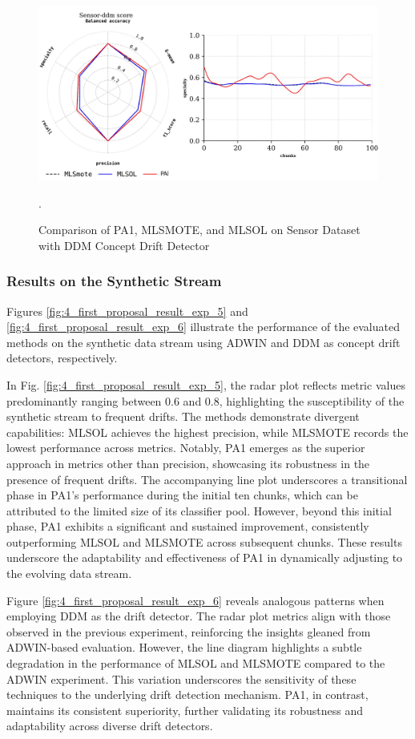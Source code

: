 \begin{figure}[!ht]
	\centering
	\includegraphics[width=1\linewidth]{4_Imbalanced/figures/exp_4.png}
  \caption{Comparison of PA1, MLSMOTE, and MLSOL on Sensor Dataset with DDM Concept Drift Detector}.
	\label{fig:4_first_proposal_result_exp_4}
\end{figure}

\subsubsection{Results on the Synthetic Stream}

Figures \ref{fig:4_first_proposal_result_exp_5} and \ref{fig:4_first_proposal_result_exp_6} illustrate the performance of the evaluated methods on the synthetic data stream using ADWIN and DDM as concept drift detectors, respectively.

In Fig. \ref{fig:4_first_proposal_result_exp_5}, the radar plot reflects metric values predominantly ranging between 0.6 and 0.8, highlighting the susceptibility of the synthetic stream to frequent drifts. The methods demonstrate divergent capabilities: MLSOL achieves the highest precision, while MLSMOTE records the lowest performance across metrics. Notably, PA1 emerges as the superior approach in metrics other than precision, showcasing its robustness in the presence of frequent drifts. The accompanying line plot underscores a transitional phase in PA1’s performance during the initial ten chunks, which can be attributed to the limited size of its classifier pool. However, beyond this initial phase, PA1 exhibits a significant and sustained improvement, consistently outperforming MLSOL and MLSMOTE across subsequent chunks. These results underscore the adaptability and effectiveness of PA1 in dynamically adjusting to the evolving data stream.

Figure \ref{fig:4_first_proposal_result_exp_6} reveals analogous patterns when employing DDM as the drift detector. The radar plot metrics align with those observed in the previous experiment, reinforcing the insights gleaned from ADWIN-based evaluation. However, the line diagram highlights a subtle degradation in the performance of MLSOL and MLSMOTE compared to the ADWIN experiment. This variation underscores the sensitivity of these techniques to the underlying drift detection mechanism. PA1, in contrast, maintains its consistent superiority, further validating its robustness and adaptability across diverse drift detectors.


